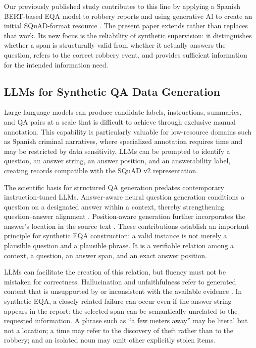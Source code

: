 \documentclass[graybox]{SNmult}
\begin{document}
Our previously published study contributes to this line by applying a Spanish BERT-based EQA model to robbery reports and using generative AI to create an initial SQuAD-format resource \cite{falconi2026robberyqa}. The present paper extends rather than replaces that work. Its new focus is the reliability of synthetic supervision: it distinguishes whether a span is structurally valid from whether it actually answers the question, refers to the correct robbery event, and provides sufficient information for the intended information need.

\subsection{LLMs for Synthetic QA Data Generation}

Large language models can produce candidate labels, instructions, summaries, and QA pairs at a scale that is difficult to achieve through exclusive manual annotation. This capability is particularly valuable for low-resource domains such as Spanish criminal narratives, where specialized annotation requires time and may be restricted by data sensitivity. LLMs can be prompted to identify a question, an answer string, an answer position, and an answerability label, creating records compatible with the SQuAD v2 representation.

The scientific basis for structured QA generation predates contemporary instruction-tuned LLMs. Answer-aware neural question generation conditions a question on a designated answer within a context, thereby strengthening question--answer alignment \cite{zhou2017neuralqg}. Position-aware generation further incorporates the answer's location in the source text \cite{sun2018answerfocused}. These contributions establish an important principle for synthetic EQA construction: a valid instance is not merely a plausible question and a plausible phrase. It is a verifiable relation among a context, a question, an answer span, and an exact answer position.

LLMs can facilitate the creation of this relation, but fluency must not be mistaken for correctness. Hallucination and unfaithfulness refer to generated content that is unsupported by or inconsistent with the available evidence \cite{ji2023hallucination,zhang2023siren}. In synthetic EQA, a closely related failure can occur even if the answer string appears in the report: the selected span can be semantically unrelated to the requested information. A phrase such as ``a few meters away'' may be literal but not a location; a time may refer to the discovery of theft rather than to the robbery; and an isolated noun may omit other explicitly stolen items.
\end{document}

